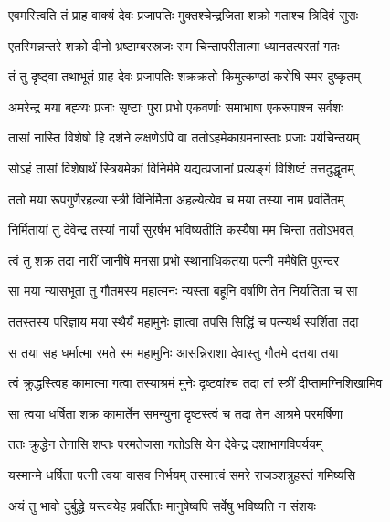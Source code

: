 \twolineshloka
{एवमस्त्विति तं प्राह वाक्यं देवः प्रजापतिः}
{मुक्तश्चेन्द्रजिता शक्रो गताश्च त्रिदिवं सुराः} %

\twolineshloka
{एतस्मिन्नन्तरे शक्रो दीनो भ्रष्टाम्बरस्रजः}
{राम चिन्तापरीतात्मा ध्यानतत्परतां गतः} %

\twolineshloka
{तं तु दृष्ट्वा तथाभूतं प्राह देवः प्रजापतिः}
{शक्रक्रतो किमुत्कण्ठां करोषि स्मर दुष्कृतम्} %

\twolineshloka
{अमरेन्द्र मया बह्व्यः प्रजाः सृष्टाः पुरा प्रभो}
{एकवर्णाः समाभाषा एकरूपाश्च सर्वशः} %

\twolineshloka
{तासां नास्ति विशेषो हि दर्शने लक्षणेऽपि वा}
{ततोऽहमेकाग्रमनास्ताः प्रजाः पर्यचिन्तयम्} %

\twolineshloka
{सोऽहं तासां विशेषार्थं स्त्रियमेकां विनिर्ममे}
{यद्यत्प्रजानां प्रत्यङ्गं विशिष्टं तत्तदुद्धृतम्} %

\twolineshloka
{ततो मया रूपगुणैरहल्या स्त्री विनिर्मिता}
{अहल्येत्येव च मया तस्या नाम प्रवर्तितम्} %

\twolineshloka
{निर्मितायां तु देवेन्द्र तस्यां नार्यां सुरर्षभ}
{भविष्यतीति कस्यैषा मम चिन्ता ततोऽभवत्} %

\twolineshloka
{त्वं तु शक्र तदा नारीं जानीषे मनसा प्रभो}
{स्थानाधिकतया पत्नी ममैषेति पुरन्दर} %

\twolineshloka
{सा मया न्यासभूता तु गौतमस्य महात्मनः}
{न्यस्ता बहूनि वर्षाणि तेन निर्यातिता च सा} %

\twolineshloka
{ततस्तस्य परिज्ञाय मया स्थैर्यं महामुनेः}
{ज्ञात्वा तपसि सिद्धिं च पत्न्यर्थं स्पर्शिता तदा} %

\twolineshloka
{स तया सह धर्मात्मा रमते स्म महामुनिः}
{आसन्निराशा देवास्तु गौतमे दत्तया तया} %

\twolineshloka
{त्वं क्रुद्धस्त्विह कामात्मा गत्वा तस्याश्रमं मुनेः}
{दृष्टवांश्च तदा तां स्त्रीं दीप्तामग्निशिखामिव} %

\twolineshloka
{सा त्वया धर्षिता शक्र कामार्तेन समन्युना}
{दृष्टस्त्वं च तदा तेन आश्रमे परमर्षिणा} %

\twolineshloka
{ततः क्रुद्धेन तेनासि शप्तः परमतेजसा}
{गतोऽसि येन देवेन्द्र दशाभागविपर्ययम्} %

\twolineshloka
{यस्मान्मे धर्षिता पत्नी त्वया वासव निर्भयम्}
{तस्मात्त्वं समरे राजञ्शत्रुहस्तं गमिष्यसि} %

\twolineshloka
{अयं तु भावो दुर्बुद्धे यस्त्वयेह प्रवर्तितः}
{मानुषेष्वपि सर्वेषु भविष्यति न संशयः} %

